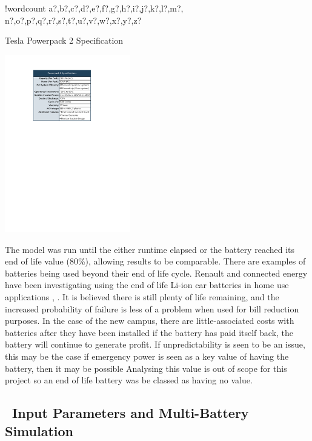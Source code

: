 \documentclass[fontsize=9.5pt]{extarticle}
\numberwithin{figure}{section} %
\newcounter{words}
\newenvironment{counted}{%
  \setcounter{words}{0}
  \SearchList!{wordcount}{\stepcounter{words}}
    {a?,b?,c?,d?,e?,f?,g?,h?,i?,j?,k?,l?,m?,
    n?,o?,p?,q?,r?,s?,t?,u?,v?,w?,x?,y?,z?}
  \UndoBoundary{'}
  \SearchOrder{p;}}{%
  \StopSearching}
\begin{document}
\begin{counted}
\begin{table}
\vspace{-20pt}
\caption{Tesla Powerpack 2 Specification}
\vspace{-5pt}
  \begin{center}
     \includegraphics[trim = 0 0 0 0, clip, width=0.41\textwidth]{PP2spec.pdf}
  \end{center}
  \vspace{-20pt}
  \label{pp2tab}
\end{table}

The model was run until the either runtime elapsed or the battery
reached its end of life value (80\%), allowing results to be comparable.
There are examples of batteries being used beyond their end of life
cycle. Renault and connected energy have been investigating using the
end of life Li-ion car batteries in home use applications
\cite{Renaultt62:online}, \cite{UsedRena38:online}. It is believed there
is still plenty of life remaining, and the increased probability of
failure is less of a problem when used for bill reduction purposes. In
the case of the new campus, there are little-associated costs with
batteries after they have been installed if the battery has paid itself
back, the battery will continue to generate profit. If unpredictability
is seen to be an issue, this may be the case if emergency power is seen
as a key value of having the battery, then it may be possible Analysing
this value is out of scope for this project so an end of life battery
was be classed as having no value.

\subsection{~Input Parameters and Multi-Battery
Simulation}\label{input-parameters-and-multi-battery-simulation}


\end{counted}
\end{document}
